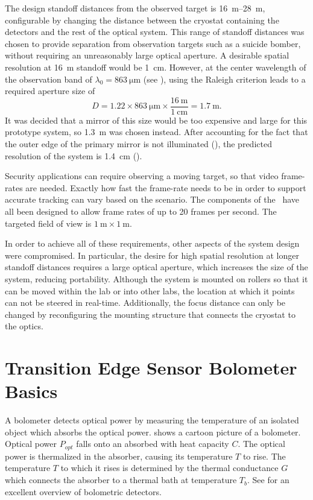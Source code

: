 The design standoff distances from the observed target is \SIrange{16}{28}{\m}, configurable by changing the distance between the cryostat containing the detectors and the rest of the optical system.
This range of standoff distances was chosen to provide separation from observation targets such as a suicide bomber, without requiring an unreasonably large optical aperture.
A desirable spatial resolution at \SI{16}{\m} standoff would be \SI{1}{\cm}.
However, at the center wavelength of the observation band of $\lambda_0 = \SI{863}{\um}$ (see ), using the Raleigh criterion  leads to a required aperture size of
\begin{equation}
  D = 1.22 \times \SI{863}{\um} \times \frac{\SI{16}{\m}}{\SI{1}{\cm}} = \SI{1.7}{\m}.
\end{equation}
It was decided that a mirror of this size would be too expensive and large for this prototype system, so \SI{1.3}{\m} was chosen instead.
After accounting for the fact that the outer edge of the primary mirror is not illuminated (), the predicted resolution of the system is \SI{1.4}{\cm} ().

Security applications can require observing a moving target, so that video frame-rates are needed.
Exactly how fast the frame-rate needs to be in order to support accurate tracking can vary based on the scenario.
The components of the \Imager\ have all been designed to allow frame rates of up to 20 frames per second.
The targeted field of view is $\SI{1}{\m} \times \SI{1}{\m}$.

In order to achieve all of these requirements, other aspects of the system design were compromised.
In particular, the desire for high spatial resolution at longer standoff distances requires a large optical aperture, which increases the size of the system, reducing portability.
Although the system is mounted on rollers so that it can be moved within the lab or into other labs, the location at which it points can not be steered in real-time.
Additionally, the focus distance can only be changed by reconfiguring the mounting structure that connects the cryostat to the optics.

\section{Transition Edge Sensor Bolometer Basics} \label{sec:ch2-tes-basics}

A bolometer detects optical power by measuring the temperature of an isolated object which absorbs the optical power.
 shows a cartoon picture of a bolometer.
Optical power $P_{opt}$ falls onto an absorbed with heat capacity $C$.
The optical power is thermalized in the absorber, causing its temperature $T$ to rise.
The temperature $T$ to which it rises is determined by the thermal conductance $G$ which connects the absorber to a thermal bath at temperature $T_b$.
See \cite{richards_bolometers_1994} for an excellent overview of bolometric detectors.

